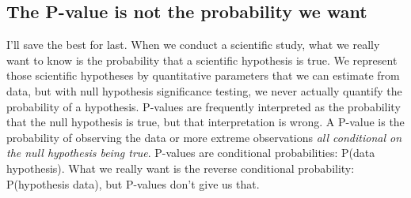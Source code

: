 \documentclass[
]{book}
\begin{document}
\subsection{The P-value is not the probability we want}\label{the-p-value-is-not-the-probability-we-want}

I'll save the best for last. When we conduct a scientific study, what we really want to know is the probability that a scientific hypothesis is true. We represent those scientific hypotheses by quantitative parameters that we can estimate from data, but with null hypothesis significance testing, we never actually quantify the probability of a hypothesis. P-values are frequently interpreted as the probability that the null hypothesis is true, but that interpretation is wrong. A P-value is the probability of observing the data or more extreme observations \emph{all conditional on the null hypothesis being true}. P-values are conditional probabilities: P(data \textbar{} hypothesis). What we really want is the reverse conditional probability: P(hypothesis \textbar{} data), but P-values don't give us that.
\end{document}
